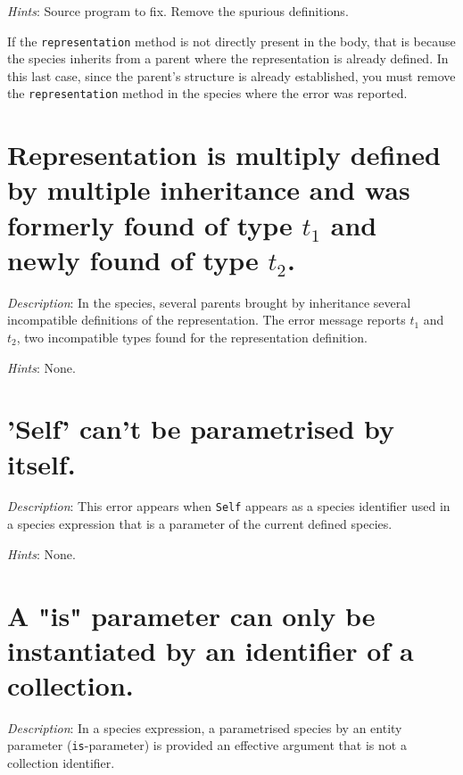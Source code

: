 {\em Hints}: Source program to fix. Remove the spurious definitions.

If the {\tt representation} method is not directly present in the
body, that is because the species inherits from a parent where the
representation is already defined. In this last case, since the parent's
structure is already established, you must remove the {\tt representation} method
in the species where the error was reported.



\section*{Representation is multiply defined by multiple
  inheritance and was formerly found of type $t_1$ and newly found of
  type $t_2$.}

{\em Description}: In the species, several parents brought by
inheritance several incompatible definitions of the representation. The error message reports $t_1$ and $t_2$, two incompatible
types found for the representation definition.

{\em Hints}: None.



\section*{'Self' can't be parametrised by itself.}

{\em Description}: This error appears when {\tt Self} appears as a
species identifier used in a species expression that is a parameter of
the current defined species.



{\em Hints}: None.



\section*{A "is" parameter can only be instantiated by an identifier of a collection.}

{\em Description}: In a species expression, a parametrised species by
an entity parameter ({\tt is}-parameter) is provided an effective
argument that is not a collection identifier.

